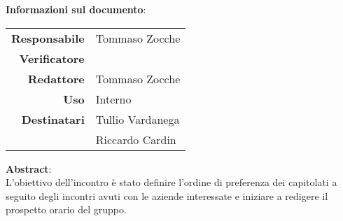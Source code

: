 \begin{center}
\textbf{Informazioni sul documento}: \\
\vspace{0.5cm}

\begin{tabular}{r|l}
    \textbf{Responsabile} & Tommaso Zocche \\ 
    \textbf{Verificatore} &  \\ 
    \textbf{Redattore} & Tommaso Zocche \\ 
    \textbf{Uso} & Interno \\ 
    \textbf{Destinatari} & Tullio Vardanega \\ & Riccardo Cardin \\ 
\end{tabular}

\vfill

\textbf{Abstract}: \\
\vspace{0.5cm}
L'obiettivo dell'incontro è stato definire l'ordine di preferenza dei capitolati a seguito degli incontri avuti con le aziende interessate e iniziare a redigere il prospetto orario del gruppo.
\end{center}


\bigskip